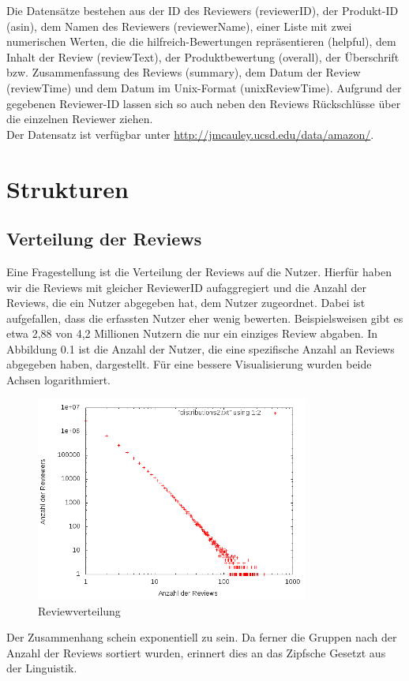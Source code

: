 \documentclass{scrartcl}
\theoremstyle{my_th_style}
\begin{document}
Die Datensätze bestehen aus der ID des Reviewers (reviewerID), der Produkt-ID (asin), dem Namen des Reviewers (reviewerName), einer Liste mit zwei numerischen Werten, die die hilfreich-Bewertungen repräsentieren (helpful), dem Inhalt der Review (reviewText), der Produktbewertung (overall), der Überschrift bzw. Zusammenfassung des Reviews (summary), dem Datum der Review (reviewTime) und dem Datum im Unix-Format (unixReviewTime). Aufgrund der gegebenen Reviewer-ID lassen sich so auch neben den Reviews Rückschlüsse über die einzelnen Reviewer ziehen.\\
Der Datensatz ist verfügbar unter \url{http://jmcauley.ucsd.edu/data/amazon/}.
\section{Strukturen}
\subsection{Verteilung der Reviews}
Eine Fragestellung ist die Verteilung der Reviews auf die Nutzer. Hierfür haben wir die Reviews mit gleicher ReviewerID aufaggregiert und die Anzahl der Reviews, die ein Nutzer abgegeben hat, dem Nutzer zugeordnet. Dabei ist aufgefallen, dass die erfassten Nutzer eher wenig bewerten. Beispielsweisen gibt es etwa 2,88 von 4,2 Millionen Nutzern die nur ein einziges Review abgaben. In Abbildung 0.1 ist die Anzahl der Nutzer, die eine spezifische Anzahl an Reviews abgegeben haben, dargestellt. Für eine bessere Visualisierung wurden beide Achsen logarithmiert. 
\begin{figure}[H]
\centering
    \includegraphics[width=0.8\textwidth]{bild.png}
    \caption{Reviewverteilung}
\end{figure}
Der Zusammenhang schein exponentiell zu sein. Da ferner die Gruppen nach der Anzahl der Reviews sortiert wurden, erinnert dies an das Zipfsche Gesetzt aus der Linguistik.
\end{document}
